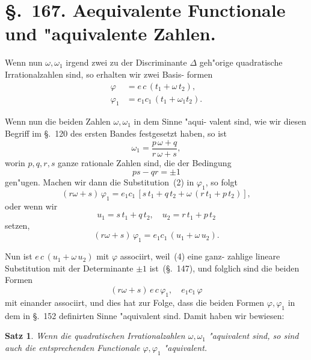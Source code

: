 \documentclass[12pt,a4paper]{article}
\theoremstyle{weber}
\newtheorem*{satz}{Satz}
\begin{document}
\newpage
\section*{\S.~167. Aequivalente Functionale und "aquivalente Zahlen.}

Wenn nun $\omega, \omega_1$ irgend zwei zu der Discriminante $\varDelta$ geh"orige
quadratische Irrationalzahlen sind, so erhalten wir zwei Basis-
formen
\begin{equation}\label{eq:s167-1}
\begin{aligned}
\varphi  &= e\,c\,(t_1 + \omega\,t_2), \\
\varphi_1 &= e_1c_1\,(t_1 + \omega_1t_2).
\end{aligned}
\end{equation}

Wenn nun die beiden Zahlen $\omega, \omega_1$ in dem Sinne "aqui-
valent sind, wie wir diesen Begriff im \S.~120 des ersten Bandes
festgesetzt haben, so ist
\begin{equation}\label{eq:s167-2}
\omega_1 = \frac{p\,\omega + q}{r\,\omega + s},
\end{equation}
worin $p, q, r, s$ ganze rationale Zahlen sind, die der Bedingung
\begin{equation}\label{eq:s167-3}
ps - qr = \pm 1
\end{equation}
gen"ugen. Machen wir dann die Substitution~(2) in $\varphi_1$, so folgt
\[
(r\omega + s)\,\varphi_1 = e_1c_1\,[s\,t_1 + q\,t_2 + \omega\,(r\,t_1 + p\,t_2)],
\]
oder wenn wir
\begin{equation}\label{eq:s167-4}
u_1 = s\,t_1 + q\,t_2, \quad u_2 = r\,t_1 + p\,t_2
\end{equation}
setzen,
\[
(r\omega + s)\,\varphi_1 = e_1c_1\,(u_1 + \omega\,u_2).
\]

Nun ist $e\,c\,(u_1 + \omega\,u_2)$ mit $\varphi$ associirt, weil~(4) eine ganz-
zahlige lineare Substitution mit der Determinante $\pm 1$ ist~(\S.~147),
und folglich sind die beiden Formen
\[
(r\omega + s)\,e\,c\,\varphi_1, \quad e_1c_1\,\varphi
\]
mit einander associirt, und dies hat zur Folge, dass die beiden
Formen $\varphi, \varphi_1$ in dem in \S.~152 definirten Sinne "aquivalent sind.
Damit haben wir bewiesen:

\begin{satz}
Wenn die quadratischen Irrationalzahlen $\omega, \omega_1$
"aquivalent sind, so sind auch die entsprechenden
Functionale $\varphi, \varphi_1$ "aquivalent.
\end{satz}
\end{document}
